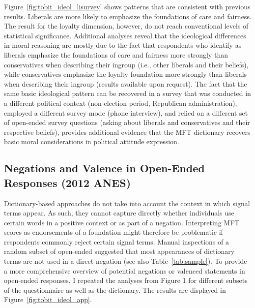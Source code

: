 \documentclass[12pt]{article}
\begin{document}
Figure~\ref{fig:tobit_ideol_lisurvey} shows patterns that are consistent with previous results. Liberals are more likely to emphasize the foundations of care and fairness. The result for the loyalty dimension, however, do not reach conventional levels of statistical significance. Additional analyses reveal that the ideological differences in moral reasoning are mostly due to the fact that respondents who identify as liberals emphasize the foundations of care and fairness more strongly than conservatives when describing their ingroup (i.e., other liberals and their beliefs), while conservatives emphasize the loyalty foundation more strongly than liberals when describing their ingroup (results available upon request). The fact that the same basic ideological pattern can be recovered in a survey that was conducted in a different political context (non-election period, Republican administration), employed a different survey mode (phone interview), and relied on a different set of open-ended survey questions (asking about liberals and conservatives and their respective beliefs), provides additional evidence that the MFT dictionary recovers basic moral considerations in political attitude expression.


\clearpage
\subsection{Negations and Valence in Open-Ended Responses (2012 ANES)}

Dictionary-based approaches do not take into account the context in which signal terms appear. As such, they cannot capture directly whether individuals use certain words in a positive context or as part of a negation. Interpreting MFT scores as endorsements of a foundation might therefore be problematic if respondents commonly reject certain signal terms. Manual inspections of a random subset of open-ended suggested that most appearances of dictionary terms are not used in a direct negation (see also Table~\ref{tab:sample}). To provide a more comprehensive overview of potential negations or valenced statements in open-ended responses, I repeated the analyses from Figure 1 for different subsets of the questionnaire as well as the dictionary. The results are displayed in Figure~\ref{fig:tobit_ideol_app}.
\end{document}
